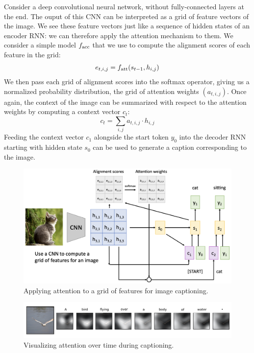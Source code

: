 Consider a deep convolutional neural network, without fully-connected layers at the end. The ouput of this CNN can be interpreted as a grid of feature vectors of the image. We see these feature vectors just like a sequence of hidden states of an encoder RNN: we can therefore apply the attention mechanism to them. We consider a simple model $f_{\textnormal{acc}}$ that we use to compute the alignment scores of each feature in the grid:
\begin{equation*}
    e_{t,i,j} = f_{\textnormal{att}}(s_{t-1}, h_{i,j})
\end{equation*}
We then pass each grid of alignment scores into the softmax operator, giving us a normalized probability distribution, the grid of attention weights $(a_{t,i,j})$. Once again, the context of the image can be summarized with respect to the attention weights by computing a context vector $c_t$:
\begin{equation*}
    c_t = \sum_{i,j} a_{t,i,j} \cdot h_{i,j}
\end{equation*} 
Feeding the context vector $c_1$ alongside the start token $y_0$ into the decoder RNN starting with hidden state $s_0$ can be used to generate a caption corresponding to the image.
\begin{figure}[H]
    \centering
    \includegraphics[width=.9\textwidth]{images/attention-cnn.png}
    \caption{Applying attention to a grid of features for image captioning.}
\end{figure}

\begin{figure}[H]
    \centering
    \includegraphics[width=\textwidth]{images/attention-bird.png}
    \caption{Visualizing attention over time during captioning.\protect\footnotemark}
\end{figure}

\newpage